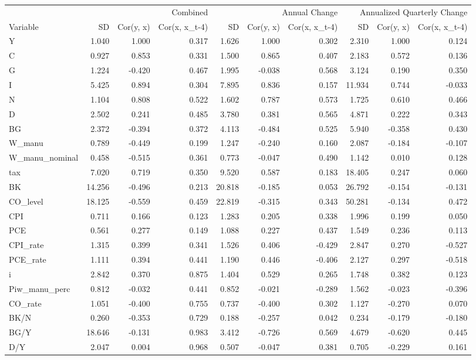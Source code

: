 \begin{tabular}{lrrrrrrrrr}
\toprule
 & \multicolumn{3}{r}{Combined} & \multicolumn{3}{r}{Annual Change} & \multicolumn{3}{r}{Annualized Quarterly Change} \\
Variable & SD & Cor(y, x) & Cor(x, x_{t-4}) & SD & Cor(y, x) & Cor(x, x_{t-4}) & SD & Cor(y, x) & Cor(x, x_{t-4}) \\
\midrule
Y & 1.040 & 1.000 & 0.317 & 1.626 & 1.000 & 0.302 & 2.310 & 1.000 & 0.124 \\
C & 0.927 & 0.853 & 0.331 & 1.500 & 0.865 & 0.407 & 2.183 & 0.572 & 0.136 \\
G & 1.224 & -0.420 & 0.467 & 1.995 & -0.038 & 0.568 & 3.124 & 0.190 & 0.350 \\
I & 5.425 & 0.894 & 0.304 & 7.895 & 0.836 & 0.157 & 11.934 & 0.744 & -0.033 \\
N & 1.104 & 0.808 & 0.522 & 1.602 & 0.787 & 0.573 & 1.725 & 0.610 & 0.466 \\
D & 2.502 & 0.241 & 0.485 & 3.780 & 0.381 & 0.565 & 4.871 & 0.222 & 0.343 \\
BG & 2.372 & -0.394 & 0.372 & 4.113 & -0.484 & 0.525 & 5.940 & -0.358 & 0.430 \\
W_manu & 0.789 & -0.449 & 0.199 & 1.247 & -0.240 & 0.160 & 2.087 & -0.184 & -0.107 \\
W_manu_nominal & 0.458 & -0.515 & 0.361 & 0.773 & -0.047 & 0.490 & 1.142 & 0.010 & 0.128 \\
tax & 7.020 & 0.719 & 0.350 & 9.520 & 0.587 & 0.183 & 18.405 & 0.247 & 0.060 \\
BK & 14.256 & -0.496 & 0.213 & 20.818 & -0.185 & 0.053 & 26.792 & -0.154 & -0.131 \\
CO_level & 18.125 & -0.559 & 0.459 & 22.819 & -0.315 & 0.343 & 50.281 & -0.134 & 0.472 \\
CPI & 0.711 & 0.166 & 0.123 & 1.283 & 0.205 & 0.338 & 1.996 & 0.199 & 0.050 \\
PCE & 0.561 & 0.277 & 0.149 & 1.088 & 0.227 & 0.437 & 1.549 & 0.236 & 0.113 \\
CPI_rate & 1.315 & 0.399 & 0.341 & 1.526 & 0.406 & -0.429 & 2.847 & 0.270 & -0.527 \\
PCE_rate & 1.111 & 0.394 & 0.441 & 1.190 & 0.446 & -0.406 & 2.127 & 0.297 & -0.518 \\
i & 2.842 & 0.370 & 0.875 & 1.404 & 0.529 & 0.265 & 1.748 & 0.382 & 0.123 \\
Piw_manu_perc & 0.812 & -0.032 & 0.441 & 0.852 & -0.021 & -0.289 & 1.562 & -0.023 & -0.396 \\
CO_rate & 1.051 & -0.400 & 0.755 & 0.737 & -0.400 & 0.302 & 1.127 & -0.270 & 0.070 \\
BK/N & 0.260 & -0.353 & 0.729 & 0.188 & -0.257 & 0.042 & 0.234 & -0.179 & -0.180 \\
BG/Y & 18.646 & -0.131 & 0.983 & 3.412 & -0.726 & 0.569 & 4.679 & -0.620 & 0.445 \\
D/Y & 2.047 & 0.004 & 0.968 & 0.507 & -0.047 & 0.381 & 0.705 & -0.229 & 0.161 \\
\bottomrule
\end{tabular}
